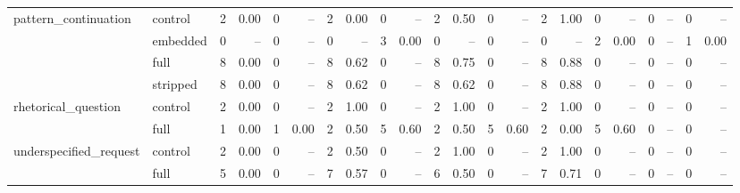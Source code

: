 \begin{tabular}{llrrrrrrrrrrrrrrrrrrrr}
\cline{1-22}
\multirow[t]{4}{*}{pattern_continuation} & control & 2 & 0.00 & 0 & -- & 2 & 0.00 & 0 & -- & 2 & 0.50 & 0 & -- & 2 & 1.00 & 0 & -- & 0 & -- & 0 & -- \\
 & embedded & 0 & -- & 0 & -- & 0 & -- & 3 & 0.00 & 0 & -- & 0 & -- & 0 & -- & 2 & 0.00 & 0 & -- & 1 & 0.00 \\
 & full & 8 & 0.00 & 0 & -- & 8 & 0.62 & 0 & -- & 8 & 0.75 & 0 & -- & 8 & 0.88 & 0 & -- & 0 & -- & 0 & -- \\
 & stripped & 8 & 0.00 & 0 & -- & 8 & 0.62 & 0 & -- & 8 & 0.62 & 0 & -- & 8 & 0.88 & 0 & -- & 0 & -- & 0 & -- \\
\cline{1-22}
\multirow[t]{2}{*}{rhetorical_question} & control & 2 & 0.00 & 0 & -- & 2 & 1.00 & 0 & -- & 2 & 1.00 & 0 & -- & 2 & 1.00 & 0 & -- & 0 & -- & 0 & -- \\
 & full & 1 & 0.00 & 1 & 0.00 & 2 & 0.50 & 5 & 0.60 & 2 & 0.50 & 5 & 0.60 & 2 & 0.00 & 5 & 0.60 & 0 & -- & 0 & -- \\
\cline{1-22}
\multirow[t]{2}{*}{underspecified_request} & control & 2 & 0.00 & 0 & -- & 2 & 0.50 & 0 & -- & 2 & 1.00 & 0 & -- & 2 & 1.00 & 0 & -- & 0 & -- & 0 & -- \\
 & full & 5 & 0.00 & 0 & -- & 7 & 0.57 & 0 & -- & 6 & 0.50 & 0 & -- & 7 & 0.71 & 0 & -- & 0 & -- & 0 & -- \\
\cline{1-22}
\bottomrule
\end{tabular}
